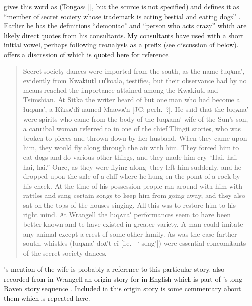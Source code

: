 \citeauthor{leer:1978b} gives this word as  (Tongass  [], but the source is not specified) and defines it as “member of secret society whose trademark is acting bestial and eating dogs” \parencite[16]{leer:1978b}.
Earlier he has the definitions “demoniac” and “person who acts crazy” \parencite[04/33]{leer:1973} which are likely direct quotes from his consultants.
My consultants have used  with a short initial vowel, perhaps following reanalysis as a prefix (see discussion of  below).
\textcite{swanton:1908} offers a discussion of  which is quoted here for reference.

\begin{quote}\small
Secret society dances were imported from the south, as the name łuqᴀna′, evidently from Kwakiutl ʟū′koala, testifies, but their observance had by no means reached the importance attained among the Kwakiutl and Tsimshian.
At Sitka the writer heard of but one man who had become a łuqᴀna′, a Kîksᴀ′dî named Maawᴀ′n [JC: perh.\ ?].
He said that the łuqᴀna′ were spirits who came from the body of the łuqᴀana′ wife of the Sun’s son, a cannibal woman referred to in one of the chief Tlingit stories, who was broken to pieces and thrown down by her husband.
When they came upon him, they would fly along through the air with him.
They forced him to eat dogs and do various other things, and they made him cry “Hai, hai, hai, hai.” Once, as they were flying along, they left him suddenly, and he dropped upon the side of a cliff where he hung on the point of a rock by his cheek.
At the time of his possession people ran around with him with rattles and sang certain songs to keep him from going away, and they also sat on the tops of the houses singing.
All this was to restore him to his right mind.
At Wrangell the łuqᴀna′ performances seem to have been better known and to have existed in greater variety.
A man could imitate any animal except a crest of some other family.
As was the case farther south, whistles (łuqᴀna′ doᴀ′t-cî [i.e.\  ‘ song’]) were essential concomitants of the secret society dances.
\end{quote}

\citeauthor{swanton:1909}’s mention of the  wife is probably a reference to this particular story. 
\citeauthor{swanton:1909} also recorded from  in Wrangell an origin story for  in English which is part of ’s long Raven story sequence \parencite[133–135]{swanton:1909}.
Included in this  origin story is some commentary about them which is repeated here.

